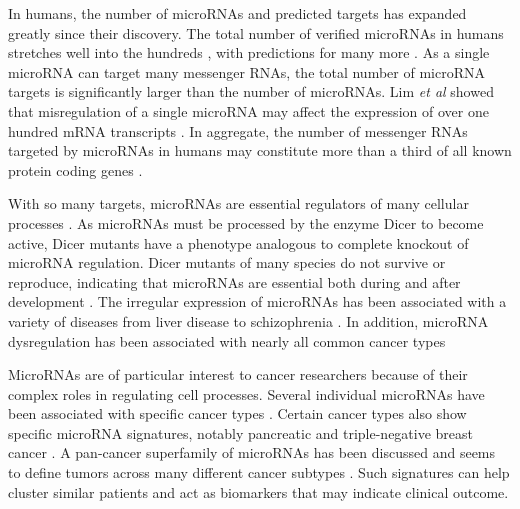 \documentclass[12pt]{report}
\begin{document}
In humans, the number of microRNAs and predicted targets has expanded greatly since their discovery.
The total number of verified microRNAs in humans  stretches well into the 
hundreds \cite{Barbarotto2008}, with predictions for many more \cite{Friedlander2014}. As a single microRNA can target 
many messenger RNAs, the total number of microRNA targets is significantly 
larger than the number of microRNAs.   Lim \emph{et al} showed that misregulation of 
a single microRNA may affect the expression of over one hundred mRNA 
transcripts \cite{Lim2005}. In aggregate, the number of messenger RNAs targeted by 
microRNAs in humans may constitute more than a third of all known protein coding genes
 \cite{Wang2011}.
 
 
With so many targets, microRNAs are essential regulators of many cellular processes \cite{Ambros2004}.  
As microRNAs must be processed by the enzyme Dicer to become active, Dicer 
mutants have a phenotype analogous to complete knockout of microRNA regulation. 
Dicer mutants of many species do not survive or reproduce, indicating that microRNAs are essential both
during and after development \cite{Bushati2007, Sayed2011}. The irregular expression of microRNAs has been 
associated with a variety of diseases from liver disease to schizophrenia \cite{Wang2012, Beveridge2012}.
In addition, microRNA dysregulation has been associated with nearly all common 
cancer types \cite{Calin2006, Sayed2011}


MicroRNAs are of particular interest to cancer researchers because of their 
complex roles in regulating cell processes. Several individual microRNAs have been 
associated with specific cancer types \cite{Calin2006, Eun2007, Yan2014}.
Certain cancer types also show specific microRNA signatures, notably pancreatic
and triple-negative breast cancer \cite{Eun2007, Sayed2011}.
A pan-cancer superfamily of microRNAs has been discussed and seems to define
tumors across many different cancer subtypes \cite{Hamilton2013}. Such 
signatures can help cluster similar patients and act as biomarkers that may 
indicate clinical outcome.


\end{document}

